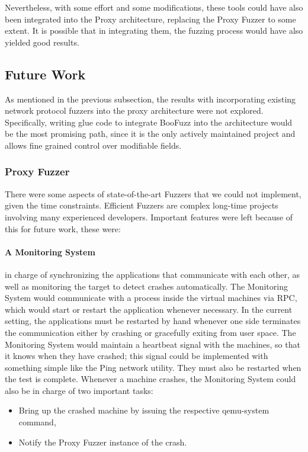 Nevertheless, with some effort and some modifications, these tools could have also been integrated
into the Proxy architecture, replacing the Proxy Fuzzer to some extent. It is possible that in integrating them,
the fuzzing process would have also yielded good results.


\subsection{Future Work}

As mentioned in the previous subsection, the results with incorporating
existing network protocol fuzzers into the proxy architecture were
not explored. Specifically, writing glue code to integrate BooFuzz into the architecture would
be the most promising path, since it is the only actively maintained project and allows fine grained control over modifiable fields.


\subsubsection{Proxy Fuzzer}

There were some aspects of state-of-the-art Fuzzers that we could not implement, given the time constraints.
Efficient Fuzzers are complex long-time projects involving many experienced developers. Important features were left
because of this for future work, these were:

\paragraph{A Monitoring System} in charge of synchronizing the applications that communicate with each other,
as well as monitoring the target to detect crashes automatically. The Monitoring System would communicate
with a process inside the virtual machines via RPC, which would start or restart the application whenever necessary.
In the current setting, the applications must be restarted by hand whenever one side terminates the communication either by crashing
or gracefully exiting from user space. The Monitoring System would maintain a heartbeat signal with the machines, so that it knows when they have
crashed; this signal could be implemented with something simple like the Ping network utility.
They must also be restarted when the test is complete. Whenever a machine crashes, the Monitoring
System could also be in charge of two important tasks:

\begin{itemize}
\item Bring up the crashed machine by issuing the respective qemu-system command,
\item Notify the Proxy Fuzzer instance of the crash.
\end{itemize}

